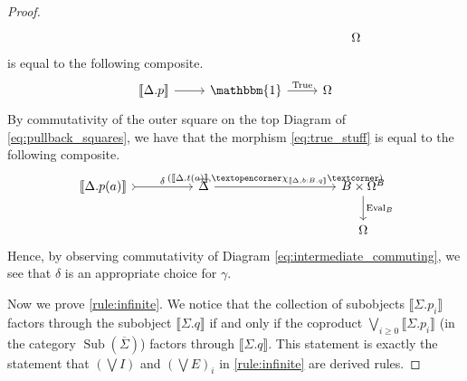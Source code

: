 \documentclass{tac}
\newcommand{\adj}[1]{\text{\textopencorner}{#1}\text{\textcorner}}
\begin{document}
\begin{proof}
\begin{equation}
\begin{tikzcd}[column sep = huge]
				&&&& \Omega
			\end{tikzcd}
		\end{equation}
		is equal to the following composite.
		\begin{equation}\label{eq:true_stuff}
			\begin{tikzcd}
				\llbracket \Delta. p\rrbracket\arrow[r] & \mathbbm{1}\arrow[r,"{\operatorname{True}}"] & \Omega
			\end{tikzcd}
		\end{equation}
		By commutativity of the outer square on the top Diagram of \eqref{eq:pullback_squares}, we have that the morphism \eqref{eq:true_stuff} is equal to the following composite.
		\begin{equation}
			\begin{tikzcd}[column sep = huge]
				\llbracket \Delta. p(a)\rrbracket\arrow[r,rightarrowtail,"{\delta}"] & \overline{\Delta}\arrow[rr,"{(\llbracket \Delta. t(a)\rrbracket, \adj{\chi_{\llbracket \Delta, b:B. q\rrbracket}})}"] & & B \times \Omega^B\arrow[d,"{\operatorname{Eval}_B}"]\\
				&&& \Omega
			\end{tikzcd}
		\end{equation}
		Hence, by observing commutativity of Diagram \eqref{eq:intermediate_commuting}, we see that $\delta$ is an appropriate choice for $\gamma$.
		
		Now we prove \eqref{rule:infinite}. We notice that the collection of subobjects $\llbracket \Sigma. p_i\rrbracket$ factors through the subobject $\llbracket \Sigma. q\rrbracket$ if and only if the coproduct $\bigvee_{i \geq 0}\llbracket \Sigma. p_i \rrbracket$ (in the category $\operatorname{Sub}(\overline{\Sigma})$) factors through $\llbracket \Sigma. q \rrbracket$. This statement is exactly the statement that $(\bigvee I)$ and $(\bigvee E)_i$ in \eqref{rule:infinite} are derived rules.
		

\end{proof}
\end{document}
